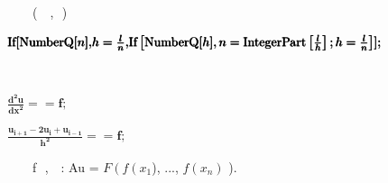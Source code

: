 \documentclass{article}
\newcommand{\unicode}[1]{{}}
\begin{document}
$\unicode{041f}\unicode{0440}\unicode{043e}\unicode{0432}\unicode{0435}\unicode{0440}\unicode{043a}\unicode{0438}$ $\unicode{0434}\unicode{043b}\unicode{044f}$
$\unicode{0448}\unicode{0430}\unicode{0433}\unicode{0430}$ $\unicode{0438}$ $\unicode{043a}\unicode{043e}\unicode{043b}\unicode{0438}\unicode{0447}\unicode{0435}\unicode{0441}\unicode{0442}\unicode{0432}\unicode{0430}$
$\unicode{0442}\unicode{043e}\unicode{0447}\unicode{0435}\unicode{043a}$ ($\unicode{043c}\unicode{043e}\unicode{0436}\unicode{0435}\unicode{043c}$
$\unicode{0432}\unicode{044b}\unicode{0441}\unicode{0442}\unicode{0430}\unicode{0432}\unicode{043b}\unicode{044f}\unicode{0442}\unicode{044c}$ $\unicode{0438}$
$\unicode{0442}\unicode{043e}$, $\unicode{0438}$ $\unicode{0442}\unicode{043e}$)

\begin{doublespace}
\noindent\(\pmb{\text{If}[\text{NumberQ}[n],}\\
\pmb{h = \frac{l}{n}, }\\
\pmb{\text{If}\left[\text{NumberQ}[h],n = \text{IntegerPart}\left[\frac{l}{h}\right]; h = \frac{l}{n}\right]}\\
\pmb{];}\)
\end{doublespace}

$\unicode{0421}\unicode{043e}\unicode{0441}\unicode{0442}\unicode{0430}\unicode{0432}\unicode{043b}\unicode{044f}\unicode{0435}\unicode{043c}$ $\unicode{0440}\unicode{0430}\unicode{0437}\unicode{043d}\unicode{043e}\unicode{0441}\unicode{0442}\unicode{043d}\unicode{043e}\unicode{0435}$
$\unicode{0443}\unicode{0440}\unicode{0430}\unicode{0432}\unicode{043d}\unicode{0435}\unicode{043d}\unicode{0438}\unicode{0435}$

\begin{doublespace}
\noindent\(\pmb{\frac{d^2u }{\text{dx}^2}== f;}\)
\end{doublespace}

\begin{doublespace}
\noindent\(\pmb{\frac{u_{i+1} - 2u_i + u_{i-1}}{h^2} == f;}\)
\end{doublespace}

$\unicode{0421}\unicode{043e}\unicode{0437}\unicode{0434}\unicode{0430}\unicode{0435}\unicode{043c}$ $\unicode{043c}\unicode{0430}\unicode{0441}\unicode{0441}\unicode{0438}\unicode{0432}$
$\unicode{0442}\unicode{043e}\unicode{0447}\unicode{0435}\unicode{043a}$ $\unicode{0438}$ $\unicode{0437}\unicode{043d}\unicode{0430}\unicode{0447}\unicode{0435}\unicode{043d}\unicode{0438}\unicode{0439}$
$\unicode{0444}\unicode{0443}\unicode{043d}\unicode{043a}\unicode{0446}\unicode{0438}\unicode{0438}$ f $\unicode{0432}$ $\unicode{043d}\unicode{0438}\unicode{0445}$,
$\unicode{0434}\unicode{0430}\unicode{043b}\unicode{0435}\unicode{0435}$ $\unicode{0440}\unicode{0435}\unicode{0448}\unicode{0430}\unicode{0435}\unicode{043c}$
$\unicode{0421}\unicode{041b}\unicode{0410}\unicode{0423}$: Au = \(F\left(f\left(x_1\right.\right.\)), ..., \(f\left(x_n\right)\) ). 
\end{document}
